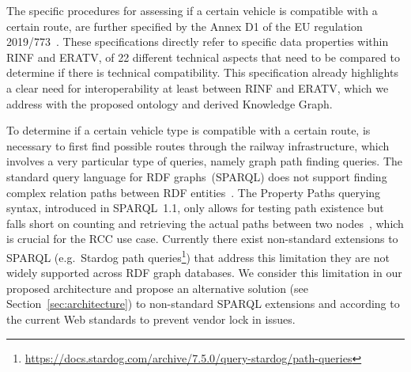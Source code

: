 The specific procedures for assessing
if a certain vehicle is compatible with a certain route,
are further specified by the Annex D1
of the EU regulation 2019/773~\cite{eu-773-2019}.
These specifications directly refer to
specific data properties within RINF and ERATV,
of 22 different technical aspects
that need to be compared to determine if there is technical compatibility.
This specification already highlights a clear need for interoperability
at least between RINF and ERATV,
which we address with the proposed ontology and derived Knowledge Graph.

To determine if a certain vehicle type
is compatible with a certain route,
is necessary to first find possible routes through the railway infrastructure,
which involves a very particular type of queries,
namely graph path finding queries.
The standard query language for RDF graphs~(SPARQL)
does not support finding complex relation paths between RDF entities~\cite{gubichev2011}.
The Property Paths querying syntax, introduced in SPARQL~1.1,
only allows for testing path existence
but falls short on counting and retrieving the actual paths between two nodes~\cite{savenkov2017},
which is crucial for the RCC use case.
Currently there exist non-standard extensions to SPARQL (e.g.~Stardog path queries\footnote{\url{https://docs.stardog.com/archive/7.5.0/query-stardog/path-queries}})
that address this limitation they are not widely supported across RDF graph databases.
We consider this limitation in our proposed architecture
and propose an alternative solution (see Section~\ref{sec:architecture}) to non-standard SPARQL extensions
and according to the current Web standards to prevent vendor lock in issues.